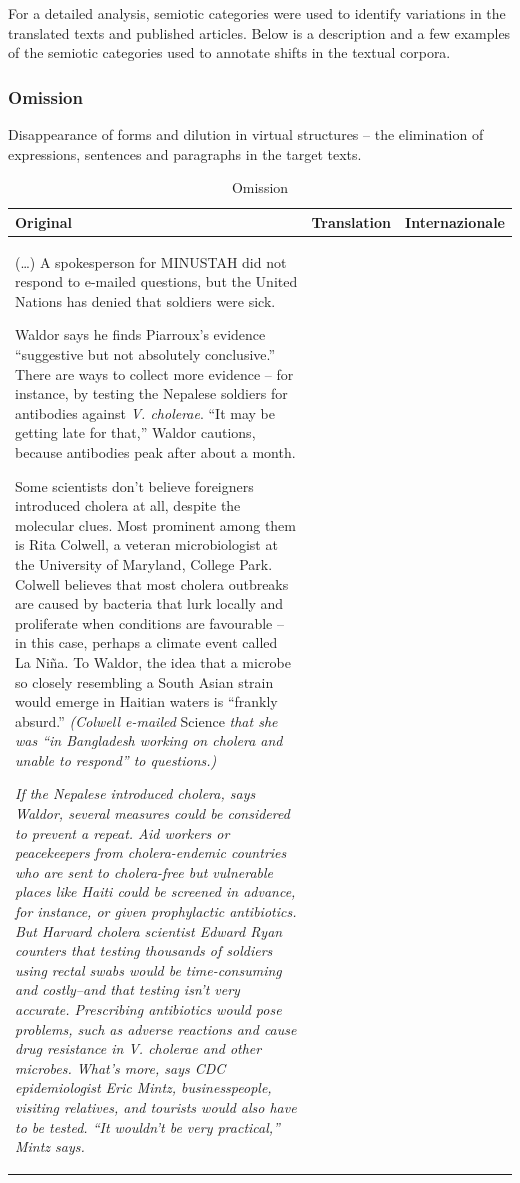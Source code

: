 \documentclass[output=paper]{LSP/langsci}
\begin{document}
For a detailed analysis, semiotic categories \citep[200--202]{Fontanille2006, Fontanille1998} were used to identify variations in the translated texts and published articles. Below is a description and a few examples of the semiotic categories used to annotate shifts in the textual corpora.

\subsubsection{Omission}

Disappearance of forms and dilution in virtual structures -- the elimination of expressions, sentences and paragraphs in the target texts. 

\begin{table} 
 \scriptsize
 \caption{Omission}
 \label{troqe-marchan:tab:1}
\begin{tabularx}{\textwidth}{Q  p{5cm} p{3cm}}
\lsptoprule
 Original &  Translation & Internazionale \\
 \midrule
 (\ldots ) A spokesperson for MINUSTAH did not respond to e-mailed questions, but the United Nations has denied that soldiers were sick.

 Waldor says he finds Piarroux's evidence ``suggestive but not absolutely conclusive.'' There are ways to collect more evidence -- for instance, by testing the Nepalese soldiers for antibodies against \textit{V. cholerae}. ``It may be getting late for that,'' Waldor cautions, because antibodies peak after about a month.

 Some scientists don't believe foreigners introduced cholera at all, despite the molecular clues. Most prominent among them is Rita Colwell, a veteran microbiologist at the University of Maryland, College Park. Colwell believes that most cholera outbreaks are caused by bacteria that lurk locally and proliferate when conditions are favourable -- in this case, perhaps a climate event called La Niña. To Waldor, the idea that a microbe so closely resembling a South Asian strain would emerge in Haitian waters is ``frankly absurd.'' \textit{(Colwell e-mailed} Science \textit{that she was ``in Bangladesh working on cholera and unable to respond'' to questions.)}

{\itshape If the Nepalese introduced cholera, says Waldor, several measures could be considered to prevent a repeat. Aid workers or peacekeepers from cholera-endemic countries who are sent to cholera-free but vulnerable places like Haiti could be screened in advance, for instance, or given prophylactic antibiotics.
But Harvard cholera scientist Edward Ryan counters that testing thousands of soldiers using rectal swabs would be time-consuming and costly--and that testing isn't very accurate. Prescribing antibiotics would pose problems, such as adverse reactions and cause drug resistance in V. cholerae and other microbes. What's more, says CDC epidemiologist Eric Mintz, businesspeople, visiting relatives, and tourists would also have to be tested. ``It wouldn't be very practical,'' Mintz says.}


\end{tabularx}
\end{table}
\end{document}
